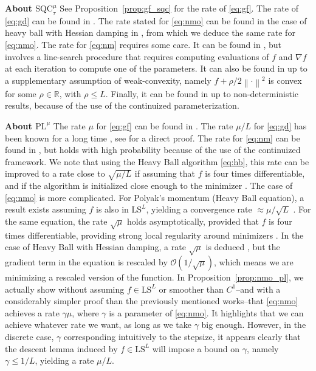 \documentclass{article}
\def\R{{\mathbb{R}}}
\def\pl{{\text{PL}^\mu}}
\newcommand{\norm}[1]{\left\lVert#1\right\rVert}
\newcommand{\sqc}{\text{SQC}_{\tau}^{\mu}}
\newcommand{\ls}{\text{LS}^{L}}
\newcommand{\bigO}{\mathcal{O}}
\theoremstyle{plain}
\theoremstyle{definition}
\theoremstyle{remark}
\begin{document}
\textbf{About $\sqc$ \:} See Proposition~\ref{prop:gf_sqc} for the rate of \eqref{eq:gf}. The rate of \eqref{eq:gd} can be found in \cite[Proposition 3]{hermant2024study}. The rate stated for \eqref{eq:nmo} can be found in the case of heavy ball with Hessian damping in \cite[Theorem 5]{hermant2024study}, from which we deduce the same rate for \eqref{eq:nmo}. The rate for \eqref{eq:nm} requires some care. It can be found in \cite[Theorem 1]{hinder2020near}, but involves a line-search procedure that requires computing evaluations of $f$ and $\nabla f$ at each iteration to compute one of the parameters. It can also be found in \cite[Theorem 2]{hermant2024study} up to a supplementary assumption of weak-convexity, namely $f + \rho/2\norm{\cdot}^2$ is convex for some $\rho \in \R$, with $\rho \le L$. Finally, it can be found in \cite[Theorem 2]{wang2023continuized} up to non-deterministic results, because of the use of the continuized parameterization.


\textbf{About $\pl$ \:} The rate $\mu$ for \eqref{eq:gf} can be found in \cite[Theorem 3]{polyak2017lyapunov}. The rate $\mu/L$ for \eqref{eq:gd} has been known for a long time \cite{Polyak1963,bolte2017error}, see \cite[Theorem 1]{karimi2016linear} for a direct proof. The rate for \eqref{eq:nm} can be found in \cite[Proposition 7]{hermant2025continuized}, but holds with high probability because of the use of the continuized framework. We note that using the Heavy Ball algorithm \eqref{eq:hb}, this rate can be improved to a rate close to $\sqrt{\mu/L}$ if assuming that $f$ is four times differentiable, and if the algorithm is initialized close enough to the minimizer \cite{kassing2024polyak}. The case of \eqref{eq:nmo} is more complicated. For Polyak's momentum (Heavy Ball equation), a result exists assuming $f$ is also in $\ls$, yielding a convergence rate $\approx \mu/\sqrt{L}$ \cite{apidopoulos2022convergence}. For the same equation, the rate $\sqrt{\mu}$ holds asymptotically, provided that $f$ is four times differentiable, providing strong local regularity around minimizers \cite{kassing2024polyak}. In the case of Heavy Ball with Hessian damping, a rate $\sqrt{\mu}$ is deduced \cite{apidopoulos2025heavy}, but the gradient term in the equation is rescaled by $\bigO(1/\sqrt{\mu})$, which means we are minimizing a rescaled version of the function. In Proposition~\ref{prop:nmo_pl}, we actually show without assuming $f \in \ls$ or smoother than $C^1$--and with a considerably simpler proof than the previously mentioned works--that \eqref{eq:nmo} achieves a rate $\gamma \mu$, where $\gamma$ is a parameter of \eqref{eq:nmo}. It highlights that we can achieve whatever rate we want, as long as we take $\gamma$ big enough. However, in the discrete case, $\gamma$ corresponding intuitively to the stepsize, it appears clearly that the descent lemma induced by $f \in \ls$ will impose a bound on $\gamma$, namely $\gamma \le 1/L$, yielding a rate $\mu/L$.
\end{document}
